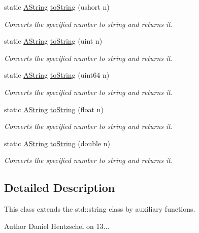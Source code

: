 \begin{DoxyCompactItemize}
static \mbox{\hyperlink{class_a_string}{A\+String}} \mbox{\hyperlink{class_a_string_abafe383896be322a46407bd02c41b897}{to\+String}} (ushort n)
\begin{DoxyCompactList}\small\item\em Converts the specified number to string and returns it. \end{DoxyCompactList}\item 
static \mbox{\hyperlink{class_a_string}{A\+String}} \mbox{\hyperlink{class_a_string_adb67a341fe4bd0661b0a5f141080d633}{to\+String}} (uint n)
\begin{DoxyCompactList}\small\item\em Converts the specified number to string and returns it. \end{DoxyCompactList}\item 
static \mbox{\hyperlink{class_a_string}{A\+String}} \mbox{\hyperlink{class_a_string_a88cbae5cb369bb16f664922dfd94b8e4}{to\+String}} (uint64 n)
\begin{DoxyCompactList}\small\item\em Converts the specified number to string and returns it. \end{DoxyCompactList}\item 
static \mbox{\hyperlink{class_a_string}{A\+String}} \mbox{\hyperlink{class_a_string_a90e2279607dbe3d80f96da3b85b5fde9}{to\+String}} (float n)
\begin{DoxyCompactList}\small\item\em Converts the specified number to string and returns it. \end{DoxyCompactList}\item 
static \mbox{\hyperlink{class_a_string}{A\+String}} \mbox{\hyperlink{class_a_string_a8f368aefb4edd72523a764d960ba7308}{to\+String}} (double n)
\begin{DoxyCompactList}\small\item\em Converts the specified number to string and returns it. \end{DoxyCompactList}\end{DoxyCompactItemize}


\subsection{Detailed Description}
This class extends the std\+::string class by auxiliary functions. 

\begin{DoxyAuthor}{Author}
Daniel Hentzschel on 13... 
\end{DoxyAuthor}


